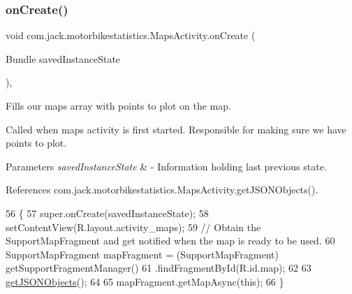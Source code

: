 \subsubsection{\texorpdfstring{on\+Create()}{onCreate()}}
{\footnotesize\ttfamily void com.\+jack.\+motorbikestatistics.\+Maps\+Activity.\+on\+Create (\begin{DoxyParamCaption}\item[{Bundle}]{saved\+Instance\+State }\end{DoxyParamCaption})\hspace{0.3cm}{\ttfamily [inline]}, {\ttfamily [protected]}}



Fills our maps array with points to plot on the map. 

Called when maps activity is first started. Responsible for making sure we have points to plot.


\begin{DoxyParams}{Parameters}
{\em saved\+Instance\+State} & -\/ Information holding last previous state. \\
\hline
\end{DoxyParams}


References com.\+jack.\+motorbikestatistics.\+Maps\+Activity.\+get\+J\+S\+O\+N\+Objects().


\begin{DoxyCode}
56                                                        \{
57         super.onCreate(savedInstanceState);
58         setContentView(R.layout.activity\_maps);
59         \textcolor{comment}{// Obtain the SupportMapFragment and get notified when the map is ready to be used.}
60         SupportMapFragment mapFragment = (SupportMapFragment) getSupportFragmentManager()
61                 .findFragmentById(R.id.map);
62 
63         \hyperlink{classcom_1_1jack_1_1motorbikestatistics_1_1_maps_activity_a0c72fcb79424420c3477add9ba6ab447}{getJSONObjects}();
64 
65         mapFragment.getMapAsync(\textcolor{keyword}{this});
66     \}
\end{DoxyCode}
\mbox{\label{classcom_1_1jack_1_1motorbikestatistics_1_1_maps_activity_a0c72fcb79424420c3477add9ba6ab447}} 
